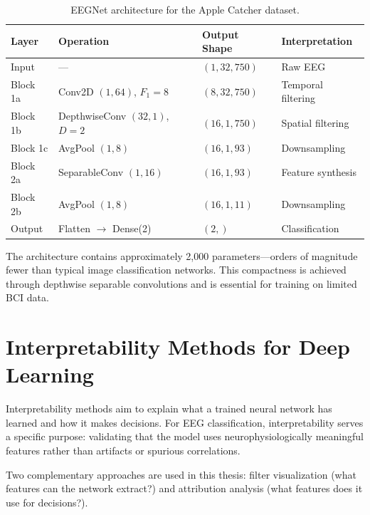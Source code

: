\begin{table}[htbp]
\centering
\caption{EEGNet architecture for the Apple Catcher dataset.}
\label{tab:eegnet_architecture}
\begin{tabular}{@{}llll@{}}
\toprule
\textbf{Layer} & \textbf{Operation} & \textbf{Output Shape} & \textbf{Interpretation} \\
\midrule
Input & — & $(1, 32, 750)$ & Raw EEG \\
Block 1a & Conv2D $(1, 64)$, $F_1=8$ & $(8, 32, 750)$ & Temporal filtering \\
Block 1b & DepthwiseConv $(32, 1)$, $D=2$ & $(16, 1, 750)$ & Spatial filtering \\
Block 1c & AvgPool $(1, 8)$ & $(16, 1, 93)$ & Downsampling \\
Block 2a & SeparableConv $(1, 16)$ & $(16, 1, 93)$ & Feature synthesis \\
Block 2b & AvgPool $(1, 8)$ & $(16, 1, 11)$ & Downsampling \\
Output & Flatten $\rightarrow$ Dense(2) & $(2,)$ & Classification \\
\bottomrule
\end{tabular}
\end{table}

The architecture contains approximately 2,000 parameters—orders of magnitude fewer than typical image classification networks. This compactness is achieved through depthwise separable convolutions and is essential for training on limited BCI data.


\section{Interpretability Methods for Deep Learning}
\label{sec:bg_interpretability}

Interpretability methods aim to explain what a trained neural network has learned and how it makes decisions. For EEG classification, interpretability serves a specific purpose: validating that the model uses neurophysiologically meaningful features rather than artifacts or spurious correlations.

Two complementary approaches are used in this thesis: filter visualization (what features can the network extract?) and attribution analysis (what features does it use for decisions?).


